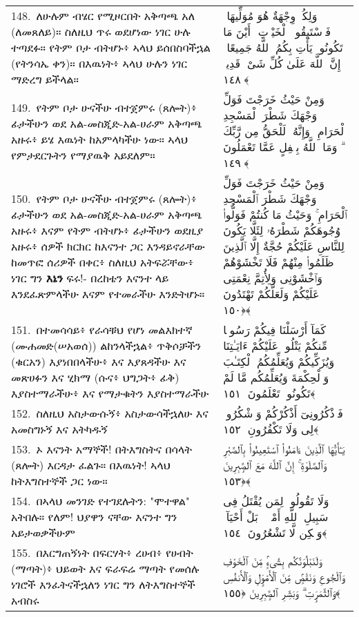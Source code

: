 \documentclass[11pt,a4paper,oneside]{article}%
\newcommand{\mytextarabic}[1]{\textarabic{ #1 \flushright}}
\begin{document}
\begin{longtable}{%
  @{}
    p{}
  @{~~~}
    p{}
    @{}
}
148.\ ለሁሉም ብሄር የሚዞርበት አቅጣጫ አለ (ለመጸለይ)። ስለዚህ ጥሩ ወደሆነው ነገር ሁሉ ተጣደፉ። የትም ቦታ ብትሆኑ፥ ኣላህ ይሰበስባችኋል (የትንሳኤ ቀን)። በእዉነት፥ ኣላህ ሁሉን ነገር ማድረግ ይችላል። &  \mytextarabic{ وَلِكُلٍّۢ وِجْهَةٌ هُوَ مُوَلِّيهَا ۖ فَٱسْتَبِقُوا۟ ٱلْخَيْرَٟتِ ۚ أَيْنَ مَا تَكُونُوا۟ يَأْتِ بِكُمُ ٱللَّهُ جَمِيعًا ۚ إِنَّ ٱللَّهَ عَلَىٰ كُلِّ شَىْءٍۢ قَدِيرٌۭ ﴿١٤٨﴾}\\
149.\ የትም ቦታ ሁናችሁ ብተጀምሩ (ጸሎት)፥ ፊታችሁን ወደ አል-መስጂድ-አል-ሀራም አቅጣጫ አዙሩ፥ ይሄ እዉነት ከአምላካችሁ ነው። ኣላህ የምታደርጉትን የማያዉቅ አይደለም። &  \mytextarabic{ وَمِنْ حَيْثُ خَرَجْتَ فَوَلِّ وَجْهَكَ شَطْرَ ٱلْمَسْجِدِ ٱلْحَرَامِ ۖ وَإِنَّهُۥ لَلْحَقُّ مِن رَّبِّكَ ۗ وَمَا ٱللَّهُ بِغَٟفِلٍ عَمَّا تَعْمَلُونَ ﴿١٤٩﴾}\\
150.\ የትም ቦታ ሁናችሁ ብተጀምሩ (ጸሎት)፥ ፊታችሁን ወደ አል-መስጂድ-አል-ሀራም አቅጣጫ አዙሩ፥ እናም የትም ብትሆኑ፥ ፊታችሁን ወደዚያ አዙሩ፥ ሰዎች ክርክር ከእናንተ ጋር እንዳይኖራቸው ከመጥፎ ሰሪዎች በቀር፥ ስለዚህ አትፍሯቸው፥ ነገር ግን  {\bf እኔን} ፍሩ!- በረከቴን እናንተ ላይ እንደፈጽምላችሁ እናም የተመራችሁ እንድትሆኑ።  &  \mytextarabic{وَمِنْ حَيْثُ خَرَجْتَ فَوَلِّ وَجْهَكَ شَطْرَ ٱلْمَسْجِدِ ٱلْحَرَامِ ۚ وَحَيْثُ مَا كُنتُمْ فَوَلُّوا۟ وُجُوهَكُمْ شَطْرَهُۥ لِئَلَّا يَكُونَ لِلنَّاسِ عَلَيْكُمْ حُجَّةٌ إِلَّا ٱلَّذِينَ ظَلَمُوا۟ مِنْهُمْ فَلَا تَخْشَوْهُمْ وَٱخْشَوْنِى وَلِأُتِمَّ نِعْمَتِى عَلَيْكُمْ وَلَعَلَّكُمْ تَهْتَدُونَ ﴿١٥٠﴾}\\
151.\ በተመሳሳይ፥ የራሳቹህ የሆነ መልእክተኛ (ሙሐመድ(ሠአወሰ)) ልከንላችኋል፥ ጥቅሶቻችን (ቁርአን) እያነበበላችሁ፥ እና እያጸዳችሁ እና መጽሀፉን እና ሂክማ (ሱና፥ ህግጋት፥ ፊቅ) እያስተማራችሁ፥ እና የማታቁትን እያስተማራችሁ &  \mytextarabic{كَمَآ أَرْسَلْنَا فِيكُمْ رَسُولًۭا مِّنكُمْ يَتْلُوا۟ عَلَيْكُمْ ءَايَـٰتِنَا وَيُزَكِّيكُمْ وَيُعَلِّمُكُمُ ٱلْكِتَـٰبَ وَٱلْحِكْمَةَ وَيُعَلِّمُكُم مَّا لَمْ تَكُونُوا۟ تَعْلَمُونَ ﴿١٥١﴾}\\
152.\ ስለዚህ አስታውሱኝ፥ አስታውሳችኋለሁ እና አመስግኑኝ እና አትካዱኝ &  \mytextarabic{فَٱذْكُرُونِىٓ أَذْكُرْكُمْ وَٱشْكُرُوا۟ لِى وَلَا تَكْفُرُونِ ﴿١٥٢﴾}\\
153.\ ኦ እናንት አማኞች! በትእግስትና በሳላት (ጸሎት) እርዳታ ፈልጉ። በእዉነት! ኣላህ ከትእግስተኞች ጋር ነው። &  \mytextarabic{يَـٰٓأَيُّهَا ٱلَّذِينَ ءَامَنُوا۟ ٱسْتَعِينُوا۟ بِٱلصَّبْرِ وَٱلصَّلَوٰةِ ۚ إِنَّ ٱللَّهَ مَعَ ٱلصَّٟبِرِينَ ﴿١٥٣﴾}\\
154.\ በኣላህ መንገድ የተገደሉትን: "ሞተዋል" አትበሉ። የለም! ህያዋን ናቸው እናንተ ግን አይታወቃችሁም &  \mytextarabic{وَلَا تَقُولُوا۟ لِمَن يُقْتَلُ فِى سَبِيلِ ٱللَّهِ أَمْوَٟتٌۢ ۚ بَلْ أَحْيَآءٌۭ وَلَٟكِن لَّا تَشْعُرُونَ ﴿١٥٤﴾}\\
155.\ በእርግጠኝነት በፍርሃት፥ ረሀብ፥ የሀብት (ማጣት)፥ ህይወት እና ፍራፍሬ ማጣት የመሰሉ ነገሮች እንፈትናችኋለን ነገር ግን ለትእግስተኞች አብስሩ &  \mytextarabic{وَلَنَبْلُوَنَّكُم بِشَىْءٍۢ مِّنَ ٱلْخَوْفِ وَٱلْجُوعِ وَنَقْصٍۢ مِّنَ ٱلْأَمْوَٟلِ وَٱلْأَنفُسِ وَٱلثَّمَرَٟتِ ۗ وَبَشِّرِ ٱلصَّٟبِرِينَ ﴿١٥٥﴾}\\

\end{longtable}
\end{document}
